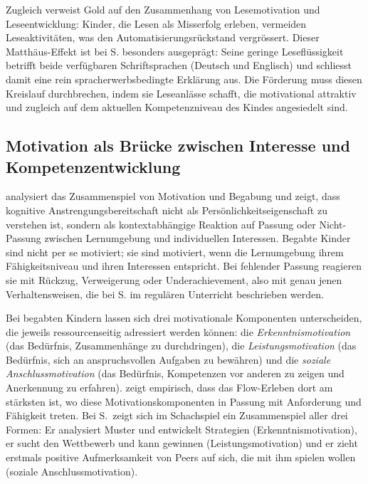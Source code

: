 \documentclass[ngerman, a4paper]{article}
\begin{document}
Zugleich verweist Gold auf den Zusammenhang von Lesemotivation und Leseentwicklung:
Kinder, die Lesen als Misserfolg erleben, vermeiden Leseaktivitäten, was den
Automatisierungsrückstand vergrössert. Dieser Matthäus-Effekt ist bei S.
besonders ausgeprägt: Seine geringe Leseflüssigkeit betrifft beide verfügbaren
Schriftsprachen (Deutsch und Englisch) und schliesst damit eine rein
spracherwerbsbedingte Erklärung aus. Die Förderung muss diesen Kreislauf
durchbrechen, indem sie Leseanlässe schafft, die motivational attraktiv und zugleich
auf dem aktuellen Kompetenzniveau des Kindes angesiedelt sind.

\subsection{Motivation als Brücke zwischen Interesse und Kompetenzentwicklung}

\textcite[S.\,84--89]{lehwald2017motivation} analysiert das Zusammenspiel von Motivation und Begabung und zeigt, dass
kognitive Anstrengungsbereitschaft nicht als Persönlichkeitseigenschaft zu verstehen ist,
sondern als kontextabhängige Reaktion auf Passung oder Nicht-Passung zwischen
Lernumgebung und individuellen Interessen. Begabte Kinder sind nicht per se motiviert;
sie sind motiviert, wenn die Lernumgebung ihrem Fähigkeitsniveau und ihren Interessen
entspricht. Bei fehlender Passung reagieren sie mit Rückzug, Verweigerung oder
Underachievement, also mit genau jenen Verhaltensweisen, die bei S. im regulären
Unterricht beschrieben werden.

Bei begabten Kindern lassen sich drei motivationale Komponenten
unterscheiden, die jeweils ressourcenseitig adressiert werden können:
die \textit{Erkenntnismotivation} (das Bedürfnis, Zusammenhänge zu
durchdringen), die \textit{Leistungsmotivation} (das Bedürfnis, sich an
anspruchsvollen Aufgaben zu bewähren) und die \textit{soziale
Anschlussmotivation} (das Bedürfnis, Kompetenzen vor anderen zu zeigen und
Anerkennung zu erfahren). \textcite[S.\,84--89]{lehwald2017motivation}
zeigt empirisch, dass das Flow-Erleben dort am stärksten ist, wo diese
Motivationskomponenten in Passung mit Anforderung und Fähigkeit treten.
Bei S.\ zeigt sich im Schachspiel ein Zusammenspiel aller drei Formen:
Er analysiert Muster und entwickelt Strategien (Erkenntnismotivation),
er sucht den Wettbewerb und kann gewinnen (Leistungsmotivation) und er
zieht erstmals positive Aufmerksamkeit von Peers auf sich, die mit ihm
spielen wollen (soziale Anschlussmotivation).
\end{document}
